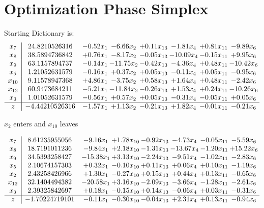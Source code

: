 \documentclass[9pt]{article}
\begin{document}
\section{Optimization Phase Simplex}
Starting Dictionary is:
\[\begin{array}{c| c c@{\hskip 2pt} c@{\hskip 2pt} c@{\hskip 2pt} c@{\hskip 2pt} c@{\hskip 2pt} c@{\hskip 2pt} }
 x_{7}   &  24.8210526316 & -0.52 x_{1} & -6.66 x_{2} & +  0.11 x_{13} & -1.81 x_{4} & +  0.81 x_{11} & -9.89 x_{6}\\
 x_{8}   &  38.5894736842 & +  0.76 x_{1} & -8.17 x_{2} & -0.05 x_{13} & -10.09 x_{4} & -0.15 x_{11} & +  9.95 x_{6}\\
 x_{9}   &  63.1157894737 & -0.14 x_{1} & -11.75 x_{2} & -0.42 x_{13} & -4.36 x_{4} & +  0.48 x_{11} & -10.42 x_{6}\\
 x_{5}   &  1.21052631579 & -0.16 x_{1} & +  0.37 x_{2} & +  0.05 x_{13} & -0.11 x_{4} & +  0.05 x_{11} & -0.95 x_{6}\\
 x_{10}   &  9.11578947368 & +  4.86 x_{1} & -3.75 x_{2} & +  0.58 x_{13} & +  1.64 x_{4} & +  0.48 x_{11} & -2.42 x_{6}\\
 x_{12}   &  60.9473684211 & -5.21 x_{1} & -11.84 x_{2} & -0.26 x_{13} & +  1.53 x_{4} & +  0.24 x_{11} & -10.26 x_{6}\\
 x_{3}   &  1.01052631579 & -0.56 x_{1} & +  0.57 x_{2} & +  0.05 x_{13} & -0.31 x_{4} & -0.05 x_{11} & +  0.05 x_{6}\\
\hline
z    &  -4.44210526316 & -1.57 x_{1} & +  1.13 x_{2} & -0.21 x_{13} & +  1.82 x_{4} & -0.01 x_{11} & -0.21 x_{6}\\
\end{array}\]


 $ x_{2} $ enters and $ x_{10} $ leaves 

 \[\begin{array}{c| c c@{\hskip 2pt} c@{\hskip 2pt} c@{\hskip 2pt} c@{\hskip 2pt} c@{\hskip 2pt} c@{\hskip 2pt} }
 x_{7}   &  8.61235955056 & -9.16 x_{1} & +  1.78 x_{10} & -0.92 x_{13} & -4.73 x_{4} & -0.05 x_{11} & -5.59 x_{6}\\
 x_{8}   &  18.7191011236 & -9.84 x_{1} & +  2.18 x_{10} & -1.31 x_{13} & -13.67 x_{4} & -1.20 x_{11} & + 15.22 x_{6}\\
 x_{9}   &  34.5393258427 & -15.38 x_{1} & +  3.13 x_{10} & -2.24 x_{13} & -9.51 x_{4} & -1.02 x_{11} & -2.83 x_{6}\\
 x_{5}   &  2.10674157303 & +  0.32 x_{1} & -0.10 x_{10} & +  0.11 x_{13} & +  0.06 x_{4} & +  0.10 x_{11} & -1.19 x_{6}\\
 x_{2}   &  2.43258426966 & +  1.30 x_{1} & -0.27 x_{10} & +  0.15 x_{13} & +  0.44 x_{4} & +  0.13 x_{11} & -0.65 x_{6}\\
 x_{12}   &  32.1404494382 & -20.58 x_{1} & +  3.16 x_{10} & -2.09 x_{13} & -3.66 x_{4} & -1.28 x_{11} & -2.61 x_{6}\\
 x_{3}   &  2.39325842697 & +  0.18 x_{1} & -0.15 x_{10} & +  0.14 x_{13} & -0.06 x_{4} & +  0.03 x_{11} & -0.31 x_{6}\\
\hline
z    &  -1.70224719101 & -0.11 x_{1} & -0.30 x_{10} & -0.04 x_{13} & +  2.31 x_{4} & +  0.13 x_{11} & -0.94 x_{6}\\
\end{array}\]
\end{document}
